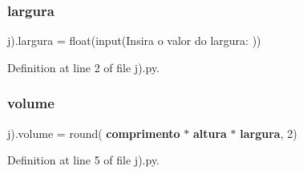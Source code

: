 \subsubsection{largura}
{\footnotesize\ttfamily j).largura = float(input(\textquotesingle{}Insira o valor do largura\+: \textquotesingle{}))}



Definition at line 2 of file j).\+py.

\mbox{\label{namespacej_08_af690a94c3e288bea3439ab07bf7f52cf}} 
\subsubsection{volume}
{\footnotesize\ttfamily j).volume = round(\textbf{ comprimento} $\ast$ \textbf{ altura} $\ast$ \textbf{ largura}, 2)}



Definition at line 5 of file j).\+py.

